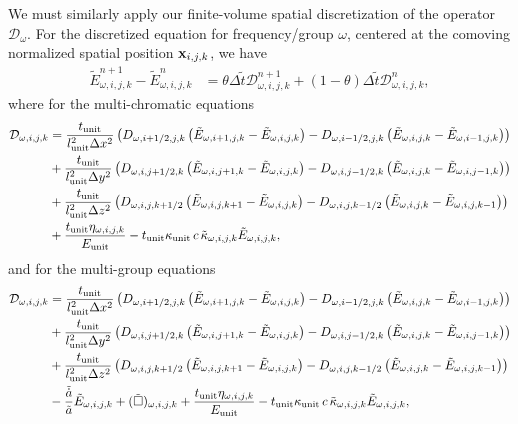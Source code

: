 \documentclass[10pt]{article}
\renewcommand{\(}{\left(}
\renewcommand{\)}{\right)}
\newcommand{\xvec}{{\bf x}}
\newcommand{\adot}{\dot{a}}
\newcommand{\mD}{{\mathcal D}}
\newcommand{\Lunit}{l_{\text{unit}}}
\newcommand{\Tunit}{t_{\text{unit}}}
\newcommand{\Eunit}{E_{\text{unit}}}
\newcommand{\Kunit}{\kappa_{\text{unit}}}
\newcommand{\tK}{\tilde{\kappa}}
\newcommand{\tT}{\tilde{t}}
\newcommand{\tE}{\tilde{E}}
\newcommand{\tA}{\tilde{a}}
\newcommand{\tAdot}{\tilde{\adot}}
\begin{document}
We must similarly apply our finite-volume spatial discretization of
the operator $\mD_{\omega}$.  For the discretized equation for
frequency/group $\omega$, centered at the comoving normalized spatial
position $\xvec_{i,j,k}$, we have  
\begin{align}
  \label{eq:mgfld_discrete}
  \tE_{\omega,i,j,k}^{n+1} - \tE_{\omega,i,j,k}^n &= \theta\Delta \tT \mD_{\omega,i,j,k}^{n+1} 
    + (1-\theta)\Delta \tT \mD_{\omega,i,j,k}^{n},
\end{align}
where for the multi-chromatic equations
\begin{align}
  \label{eq:discrete_multichromatic_operator}
  \mD_{\omega,i,j,k} &= 
       \frac{\Tunit}{\Lunit^2 \Delta x^2}\(D_{\omega,i+1/2,j,k}\(\tE_{\omega,i+1,j,k} - \tE_{\omega,i,j,k}\) - D_{\omega,i-1/2,j,k}\(\tE_{\omega,i,j,k} - \tE_{\omega,i-1,j,k}\)\) \\
 \notag
    &+ \frac{\Tunit}{\Lunit^2 \Delta y^2}\(D_{\omega,i,j+1/2,k}\(\tE_{\omega,i,j+1,k} - \tE_{\omega,i,j,k}\) - D_{\omega,i,j-1/2,k}\(\tE_{\omega,i,j,k} - \tE_{\omega,i,j-1,k}\)\) \\
  \notag
    &+ \frac{\Tunit}{\Lunit^2 \Delta z^2}\(D_{\omega,i,j,k+1/2}\(\tE_{\omega,i,j,k+1} - \tE_{\omega,i,j,k}\) - D_{\omega,i,j,k-1/2}\(\tE_{\omega,i,j,k} - \tE_{\omega,i,j,k-1}\)\) \\
  \notag
    &+ \frac{\Tunit \eta_{\omega,i,j,k}}{\Eunit} 
     - \Tunit \Kunit\, c\, \tK_{\omega,i,j,k} \tE_{\omega,i,j,k},
\end{align}
and for the multi-group equations
\begin{align}
  \label{eq:discrete_multigroup_operator}
  \mD_{\omega,i,j,k} &= 
       \frac{\Tunit}{\Lunit^2 \Delta x^2}\(D_{\omega,i+1/2,j,k}\(\tE_{\omega,i+1,j,k} - \tE_{\omega,i,j,k}\) - D_{\omega,i-1/2,j,k}\(\tE_{\omega,i,j,k} - \tE_{\omega,i-1,j,k}\)\) \\
 \notag
    &+ \frac{\Tunit}{\Lunit^2 \Delta y^2}\(D_{\omega,i,j+1/2,k}\(\tE_{\omega,i,j+1,k} - \tE_{\omega,i,j,k}\) - D_{\omega,i,j-1/2,k}\(\tE_{\omega,i,j,k} - \tE_{\omega,i,j-1,k}\)\) \\
  \notag
    &+ \frac{\Tunit}{\Lunit^2 \Delta z^2}\(D_{\omega,i,j,k+1/2}\(\tE_{\omega,i,j,k+1} - \tE_{\omega,i,j,k}\) - D_{\omega,i,j,k-1/2}\(\tE_{\omega,i,j,k} - \tE_{\omega,i,j,k-1}\)\) \\
  \notag
    &- \frac{\tAdot}{\tA} \tE_{\omega,i,j,k} + (\tilde{\square})_{\omega,i,j,k} 
     + \frac{\Tunit \eta_{\omega,i,j,k}}{\Eunit} 
     - \Tunit \Kunit\, c\, \tK_{\omega,i,j,k} \tE_{\omega,i,j,k},
\end{align}
\end{document}
